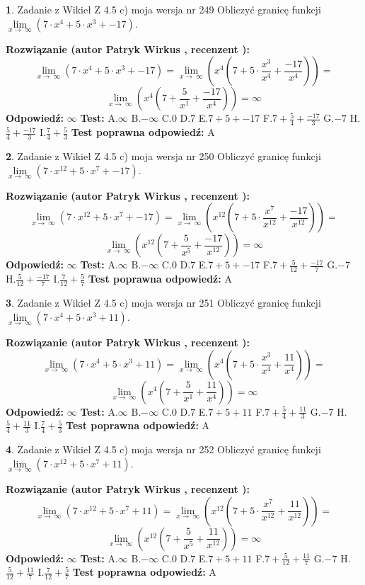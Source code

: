 \documentclass[12pt, a4paper]{article}
\theoremstyle{definition} %
\newtheorem{zad}{}
\newcommand{\zadStart}[1]{\begin{zad}#1\newline}
\newcommand{\zadStop}{\end{zad}}
\newcommand{\rozwStart}[2]{\noindent \textbf{Rozwiązanie (autor #1 , recenzent #2): }\newline}
\newcommand{\rozwStop}{\newline}
\newcommand{\odpStart}{\noindent \textbf{Odpowiedź:}\newline}
\newcommand{\odpStop}{\newline}
\newcommand{\testStart}{\noindent \textbf{Test:}\newline}
\newcommand{\testStop}{\newline}
\newcommand{\kluczStart}{\noindent \textbf{Test poprawna odpowiedź:}\newline}
\newcommand{\kluczStop}{\newline}
\begin{document}
\zadStart{Zadanie z Wikieł Z 4.5 c) moja wersja nr 249}
Obliczyć granicę funkcji  $\lim\limits_{x\to\ \infty}(7 \cdot x^{4}+5 \cdot x^{3}+-17)$.
\zadStop
\rozwStart{Patryk Wirkus}{}
$$\lim\limits_{x\to\ \infty}(7 \cdot x^{4}+5 \cdot x^{3}+-17) = \lim\limits_{x\to\ \infty}(x^{4}(7 +5 \cdot \frac{x^{3}}{x^{4}}+\frac{-17}{x^{4}})) =$$ $$\lim\limits_{x\to\ \infty}(x^{4}(7 +\frac{5}{x^{1}}+\frac{-17}{x^{4}})) =\infty$$
\rozwStop
\odpStart
$\infty$
\odpStop
\testStart
A.$\infty$ B.$-\infty$ C.$0$ D.$7$ E.$7 + 5 + -17$
F.$7+\frac{5}{4}+\frac{-17}{3}$ G.$-7$
H.$\frac{5}{4}+\frac{-17}{3}$
I.$\frac{7}{4}+\frac{5}{3}$
\testStop
\kluczStart
A
\kluczStop



\zadStart{Zadanie z Wikieł Z 4.5 c) moja wersja nr 250}
Obliczyć granicę funkcji  $\lim\limits_{x\to\ \infty}(7 \cdot x^{12}+5 \cdot x^{7}+-17)$.
\zadStop
\rozwStart{Patryk Wirkus}{}
$$\lim\limits_{x\to\ \infty}(7 \cdot x^{12}+5 \cdot x^{7}+-17) = \lim\limits_{x\to\ \infty}(x^{12}(7 +5 \cdot \frac{x^{7}}{x^{12}}+\frac{-17}{x^{12}})) =$$ $$\lim\limits_{x\to\ \infty}(x^{12}(7 +\frac{5}{x^{5}}+\frac{-17}{x^{12}})) =\infty$$
\rozwStop
\odpStart
$\infty$
\odpStop
\testStart
A.$\infty$ B.$-\infty$ C.$0$ D.$7$ E.$7 + 5 + -17$
F.$7+\frac{5}{12}+\frac{-17}{7}$ G.$-7$
H.$\frac{5}{12}+\frac{-17}{7}$
I.$\frac{7}{12}+\frac{5}{7}$
\testStop
\kluczStart
A
\kluczStop



\zadStart{Zadanie z Wikieł Z 4.5 c) moja wersja nr 251}
Obliczyć granicę funkcji  $\lim\limits_{x\to\ \infty}(7 \cdot x^{4}+5 \cdot x^{3}+11)$.
\zadStop
\rozwStart{Patryk Wirkus}{}
$$\lim\limits_{x\to\ \infty}(7 \cdot x^{4}+5 \cdot x^{3}+11) = \lim\limits_{x\to\ \infty}(x^{4}(7 +5 \cdot \frac{x^{3}}{x^{4}}+\frac{11}{x^{4}})) =$$ $$\lim\limits_{x\to\ \infty}(x^{4}(7 +\frac{5}{x^{1}}+\frac{11}{x^{4}})) =\infty$$
\rozwStop
\odpStart
$\infty$
\odpStop
\testStart
A.$\infty$ B.$-\infty$ C.$0$ D.$7$ E.$7 + 5 + 11$
F.$7+\frac{5}{4}+\frac{11}{3}$ G.$-7$
H.$\frac{5}{4}+\frac{11}{3}$
I.$\frac{7}{4}+\frac{5}{3}$
\testStop
\kluczStart
A
\kluczStop



\zadStart{Zadanie z Wikieł Z 4.5 c) moja wersja nr 252}
Obliczyć granicę funkcji  $\lim\limits_{x\to\ \infty}(7 \cdot x^{12}+5 \cdot x^{7}+11)$.
\zadStop
\rozwStart{Patryk Wirkus}{}
$$\lim\limits_{x\to\ \infty}(7 \cdot x^{12}+5 \cdot x^{7}+11) = \lim\limits_{x\to\ \infty}(x^{12}(7 +5 \cdot \frac{x^{7}}{x^{12}}+\frac{11}{x^{12}})) =$$ $$\lim\limits_{x\to\ \infty}(x^{12}(7 +\frac{5}{x^{5}}+\frac{11}{x^{12}})) =\infty$$
\rozwStop
\odpStart
$\infty$
\odpStop
\testStart
A.$\infty$ B.$-\infty$ C.$0$ D.$7$ E.$7 + 5 + 11$
F.$7+\frac{5}{12}+\frac{11}{7}$ G.$-7$
H.$\frac{5}{12}+\frac{11}{7}$
I.$\frac{7}{12}+\frac{5}{7}$
\testStop
\kluczStart
A
\kluczStop
\end{document}
